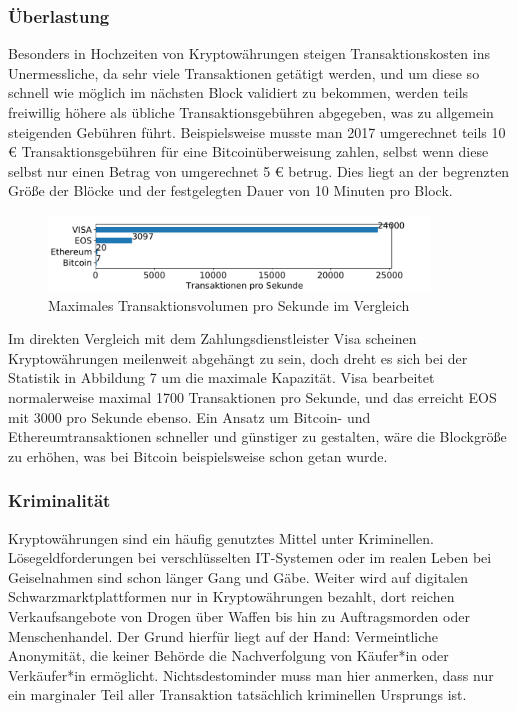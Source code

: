 \documentclass[12pt,oneside]{article}
\begin{document}
\subsubsection{Überlastung}

Besonders in Hochzeiten von Kryptowährungen steigen Transaktionskosten ins Unermessliche, da sehr viele Transaktionen getätigt werden, und um diese so schnell wie möglich im nächsten Block validiert zu bekommen, werden teils freiwillig höhere als übliche Transaktionsgebühren abgegeben, was zu allgemein steigenden Gebühren führt. Beispielsweise musste man 2017 umgerechnet teils 10 € Transaktionsgebühren für eine Bitcoinüberweisung zahlen, selbst wenn diese selbst nur einen Betrag von umgerechnet 5 € betrug. Dies liegt an der begrenzten Größe der Blöcke und der festgelegten Dauer von 10 Minuten pro Block. 


\begin{figure}[h]
\centering
\includegraphics[width=0.9\textwidth]{./images/transactions.pdf}
\caption{Maximales Transaktionsvolumen pro Sekunde im Vergleich \cite{rosenberg2019}}
\centering
\end{figure}

Im direkten Vergleich mit dem Zahlungsdienstleister Visa scheinen Kryptowährungen meilenweit abgehängt zu sein, doch dreht es sich bei der Statistik in Abbildung 7 um die maximale Kapazität. Visa bearbeitet normalerweise maximal 1700 Transaktionen pro Sekunde, und das erreicht EOS mit 3000 pro Sekunde ebenso. Ein Ansatz um Bitcoin- und Ethereumtransaktionen schneller und günstiger zu gestalten, wäre die Blockgröße zu erhöhen, was bei Bitcoin beispielsweise schon getan wurde.\cite{rosenberg2019}

\subsubsection{Kriminalität}

Kryptowährungen sind ein häufig genutztes Mittel unter Kriminellen. Lösegeldforderungen bei verschlüsselten IT-Systemen oder im realen Leben bei Geiselnahmen sind schon länger Gang und Gäbe. Weiter wird auf digitalen Schwarzmarktplattformen nur in Kryptowährungen bezahlt, dort reichen Verkaufsangebote von Drogen über Waffen bis hin zu Auftragsmorden oder Menschenhandel. Der Grund hierfür liegt auf der Hand: Vermeintliche Anonymität, die keiner Behörde die Nachverfolgung von Käufer*in oder Verkäufer*in ermöglicht. Nichtsdestominder muss man hier anmerken, dass nur ein marginaler Teil aller Transaktion tatsächlich kriminellen Ursprungs ist.
\end{document}
